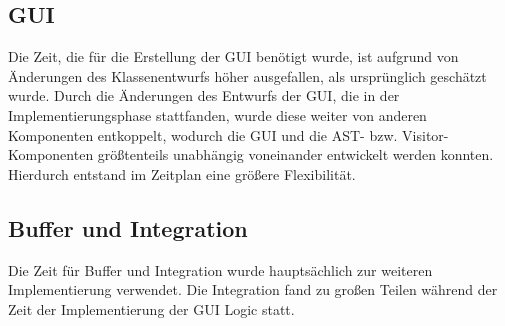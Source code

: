 \subsection{GUI}
Die Zeit, die f\"{u}r die Erstellung der GUI ben\"{o}tigt wurde, ist aufgrund von \"{A}nderungen des Klassenentwurfs h\"{o}her ausgefallen, als urspr\"{u}nglich gesch\"{a}tzt wurde.
Durch die \"{A}nderungen des Entwurfs der GUI, die in der Implementierungsphase stattfanden, wurde diese weiter von anderen Komponenten entkoppelt, wodurch die GUI und die AST- bzw. Visitor-Komponenten gr\"{o}\ss tenteils unabh\"{a}ngig voneinander entwickelt werden konnten. Hierdurch entstand im Zeitplan eine gr\"{o}\ss ere Flexibilit\"{a}t.
\subsection{Buffer und Integration}
Die Zeit f\"{u}r Buffer und Integration wurde haupts\"{a}chlich zur weiteren Implementierung verwendet. Die Integration fand zu gro\ss en Teilen w\"{a}hrend der Zeit der Implementierung der GUI Logic statt.
